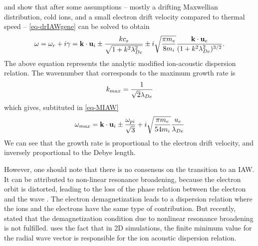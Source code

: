     \citet{lafleur2016} and \citet{janhunen2018} show that after some assumptions -- mostly a drifting Maxwellian distribution, cold ions, and a small electron drift velocity compared to thermal speed -- \cref{eq-drIAWgene} can be solved to obtain
    \begin{equation} \label{eq-MIAW}
      \omega = \omega_r + i \gamma = {\mathbf k} \cdot {\mathbf u_{i}} \pm \frac{k c_s}{\sqrt{1 + k^2 \lambda_{De}^2}} \pm i \sqrt{\frac{\pi m_e}{8 m_i}} \frac{{\mathbf k} \cdot {\mathbf u_{e}}}{( 1 + k^2 \lambda_{De}^2)^{3/2}}.
    \end{equation}
    The above equation represents the analytic modified ion-acoustic dispersion relation.
    The wavenumber that corresponds to the maximum growth rate is \citep{lafleur2016}
    \begin{equation} \label{eq-mostk}
      k_{max} = \frac{1}{\sqrt{2} \lambda_{De}}
    \end{equation}
    which gives, subtituted in \cref{eq-MIAW}
    \begin{equation} \label{eq-mostw}
      \omega_{max} =  {\mathbf k} \cdot {\mathbf u_{i}} \pm \frac{\omega_{pi}}{\sqrt{3}} + i \sqrt{ \frac{\pi m_e}{54 m_i}}\frac{u_e}{\lambda_{De}}
    \end{equation}
    We can see that the growth rate is proportional to the electron drift velocity, and inversely proportional to the Debye length.
    
    However, one should note that there is no consensus on the transition to an \ac{IAW}.
    It can be attributed to non-linear resonance broadening, because the electron orbit is distorted, leading to the loss of the phase relation between the electron and the wave \citep{taccogna2019}.
    The electron demagnetization leads to a dispersion relation where the ions and the electrons have the same type of contribution.
    But recently, \citet{janhunen2018a} stated that the demagnetization condition due to nonlinear resonance broadening is not fulfilled.
    \citet{lafleur2017a} uses the fact that in \ac{2D} simulations, the finite minimum value for the radial wave vector is responsible for the ion acoustic dispersion relation.
    
    